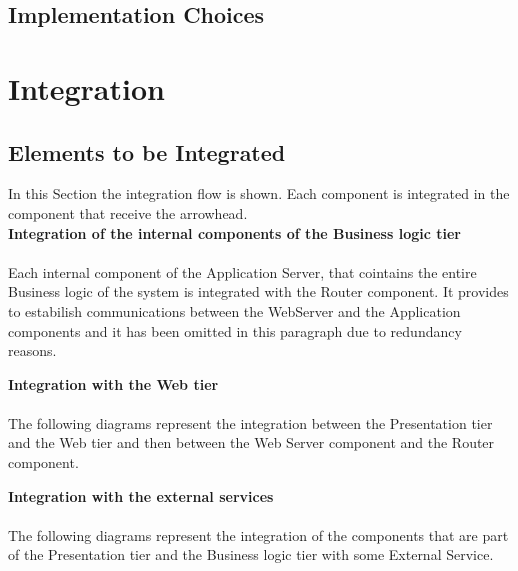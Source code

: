 \documentclass[../DD.tex]{subfiles}
\begin{document}
\subsection{Implementation Choices\label{5.2.2}}



\section{Integration\label{5.3}}

\subsection{Elements to be Integrated\label{5.3.1}}

In this Section the integration flow is shown. Each component is integrated in the component that receive the arrowhead. \\

\textbf{Integration of the internal components of the Business logic tier} \\
\\ Each internal component of the Application Server, that cointains the entire Business logic of the system is integrated with the Router component. It provides to estabilish communications between the WebServer and the Application components and it has been omitted in this paragraph due to redundancy reasons.  \\


\textbf{Integration with the Web tier} \\
\\ The following diagrams represent the integration between the Presentation tier and the Web tier and then between the Web Server component and the Router component. \\


\textbf{Integration with the external services} \\
\\ The following diagrams represent the integration of the components that are part of the Presentation tier and the Business logic tier with some External Service. \\
\end{document}

